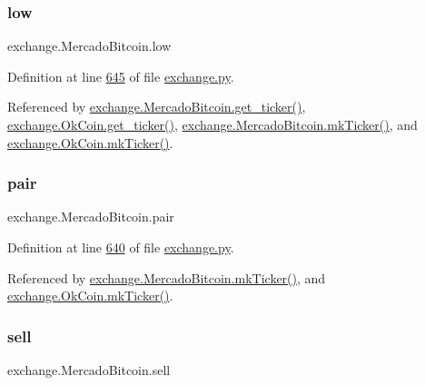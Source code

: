 \subsubsection{\texorpdfstring{low}{low}}
{\footnotesize\ttfamily exchange.\+Mercado\+Bitcoin.\+low}



Definition at line \hyperlink{exchange_8py_source_l00645}{645} of file \hyperlink{exchange_8py_source}{exchange.\+py}.



Referenced by \hyperlink{exchange_8py_source_l00651}{exchange.\+Mercado\+Bitcoin.\+get\+\_\+ticker()}, \hyperlink{exchange_8py_source_l00716}{exchange.\+Ok\+Coin.\+get\+\_\+ticker()}, \hyperlink{exchange_8py_source_l00665}{exchange.\+Mercado\+Bitcoin.\+mk\+Ticker()}, and \hyperlink{exchange_8py_source_l00730}{exchange.\+Ok\+Coin.\+mk\+Ticker()}.

\mbox{\label{classexchange_1_1_mercado_bitcoin_a879f8ca352d313230d72e6e8785985a1}} 
\subsubsection{\texorpdfstring{pair}{pair}}
{\footnotesize\ttfamily exchange.\+Mercado\+Bitcoin.\+pair}



Definition at line \hyperlink{exchange_8py_source_l00640}{640} of file \hyperlink{exchange_8py_source}{exchange.\+py}.



Referenced by \hyperlink{exchange_8py_source_l00665}{exchange.\+Mercado\+Bitcoin.\+mk\+Ticker()}, and \hyperlink{exchange_8py_source_l00730}{exchange.\+Ok\+Coin.\+mk\+Ticker()}.

\mbox{\label{classexchange_1_1_mercado_bitcoin_a9982c7a3f6103c88c64160a5854c35cd}} 
\subsubsection{\texorpdfstring{sell}{sell}}
{\footnotesize\ttfamily exchange.\+Mercado\+Bitcoin.\+sell}



